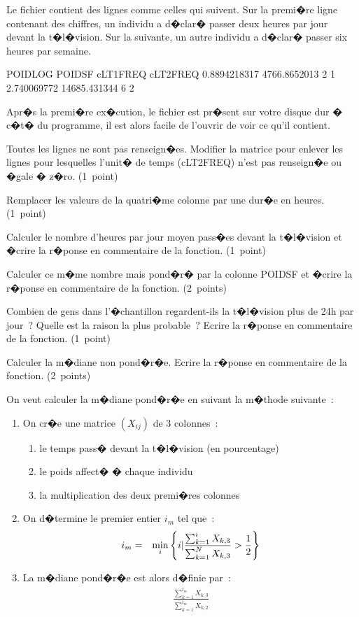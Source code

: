 \begin{xexercice}
{Le fichier contient des lignes comme celles qui suivent. Sur la premi�re ligne contenant des chiffres, un individu a d�clar� passer deux heures par jour devant la t�l�vision. Sur la suivante, un autre individu a d�clar� passer six heures par semaine.

\begin{verbatimx}
POIDLOG       POIDSF         cLT1FREQ  cLT2FREQ
0.8894218317  4766.8652013   2         1
2.740069772   14685.431344   6         2
\end{verbatimx}

Apr�s la premi�re ex�cution, le fichier est pr�sent sur votre disque dur � c�t� du programme, il est alors facile de l'ouvrir de voir ce qu'il contient.

\exequest Toutes les lignes ne sont pas renseign�es. Modifier la matrice pour enlever les lignes pour lesquelles l'unit� de temps (cLT2FREQ) n'est pas renseign�e ou �gale � z�ro. (1~point)

\exequest Remplacer les valeurs de la quatri�me colonne par une dur�e en heures. (1~point)

\exequest Calculer le nombre d'heures par jour moyen pass�es devant la t�l�vision et �crire la r�ponse en commentaire de la fonction. (1~point)

\exequest Calculer ce m�me nombre mais pond�r� par la colonne POIDSF et �crire la r�ponse en commentaire de la fonction.  (2~points)

\exequest Combien de gens dans l'�chantillon regardent-ils la t�l�vision plus de 24h par jour~? Quelle est la raison la plus probable~? Ecrire la r�ponse en commentaire de la fonction.  (1~point)

\exequest Calculer la m�diane non pond�r�e. Ecrire la r�ponse en commentaire de la fonction.  (2~points)

\exequest On veut calculer la m�diane pond�r�e en suivant la m�thode suivante~:
\begin{enumerate}
\item On cr�e une matrice $(X_{ij})$ de 3 colonnes~:
					\begin{enumerate}
					\item le temps pass� devant la t�l�vision (en pourcentage)
					\item le poids affect� � chaque individu
					\item la multiplication des deux premi�res colonnes
					\end{enumerate}
\item On d�termine le premier entier $i_m$ tel que~:
					\begin{eqnarray}
					i_m &=& \min_i \left\{ i | \frac{ \sum_{k=1}^{i} X_{k,3} } { \sum_{k=1}^{N} X_{k,3}  } > \frac{1}{2} \right\}
					\end{eqnarray}
\item La m�diane pond�r�e est alors d�finie par~:					
					\begin{eqnarray}
					\frac{ \sum_{k=1}^{i_m} X_{k,3} } { \sum_{k=1}^{i_m} X_{k,2}  } 
					\end{eqnarray}
\end{enumerate}					

}
\end{xexercice}
